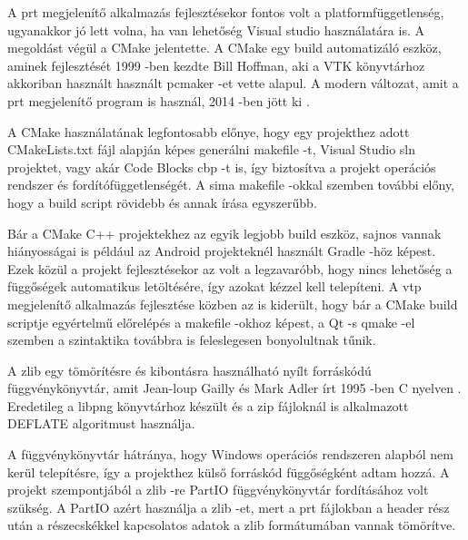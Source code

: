 A prt megjelenítő alkalmazás fejlesztésekor fontos volt a platformfüggetlenség, 
ugyanakkor jó lett volna, 
ha van lehetőség Visual studio használatára is. 
A megoldást végül a CMake jelentette.
A CMake egy build automatizáló eszköz, 
aminek fejlesztését 1999 -ben kezdte Bill Hoffman, 
aki a VTK könyvtárhoz akkoriban használt 
használt pcmaker -et vette alapul. 
A modern változat, 
amit a prt megjelenítő program is használ, 
2014 -ben jött ki \cite{wiki:cmake}.

\begin{sloppypar}
A CMake használatának legfontosabb előnye, 
hogy egy projekthez adott {\ttfamily CMakeLists.txt} fájl 
alapján képes generálni makefile -t, 
Visual Studio sln projektet, 
vagy akár Code Blocks cbp -t is, 
így biztosítva a projekt operációs rendszer 
és fordítófüggetlenségét. 
A sima makefile -okkal szemben további előny, 
hogy a build script rövidebb és annak írása egyszerűbb.
\end{sloppypar}

Bár a CMake C++ projektekhez az egyik legjobb build eszköz, 
sajnos vannak hiányosságai is például 
az Android projekteknél használt Gradle -höz képest. 
Ezek közül a projekt fejlesztésekor az volt a legzavaróbb, 
hogy nincs lehetőség a függőségek automatikus letöltésére, 
így azokat kézzel kell telepíteni. 
A vtp megjelenítő alkalmazás fejlesztése közben az is kiderült, 
hogy bár a CMake build scriptje egyértelmű 
előrelépés a makefile -okhoz képest, 
a Qt -s qmake -el szemben a szintaktika továbbra is 
feleslegesen bonyolultnak tűnik.

\vspace{3mm}


\vspace{2mm}

\noindent A zlib egy tömörítésre és kibontásra használható 
nyílt forráskódú függvénykönyvtár, 
amit Jean-loup Gailly 
és Mark Adler írt 1995 -ben C nyelven \cite{wiki:zlib}. 
Eredetileg a libpng könyvtárhoz készült és a zip fájloknál is 
alkalmazott DEFLATE algoritmust használja.

A függvénykönyvtár hátránya, 
hogy Windows operációs rendszeren alapból nem kerül telepítésre,
így a projekthez külső forráskód függőségként adtam hozzá. 
A projekt szempontjából a zlib -re PartIO függvénykönyvtár fordításához volt szükség. 
A PartIO azért használja a zlib -et, 
mert a prt fájlokban a header rész után a részecskékkel kapcsolatos adatok 
a zlib formátumában vannak tömörítve.

